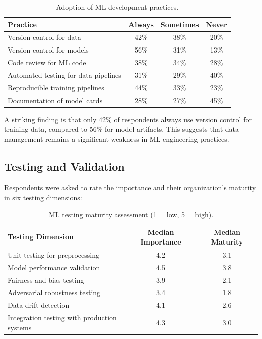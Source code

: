 \documentclass[
    language=english,
    doctype=survey-report,
    institution=none,
]{../../omnilatex}
\begin{document}
\begin{table}[htbp]
    \centering
    \caption{Adoption of ML development practices.}
    \label{tab:dev-practices}
    \begin{tabular}{@{}lccc@{}}
        \toprule
        Practice & Always & Sometimes & Never \\
        \midrule
        Version control for data & 42\% & 38\% & 20\% \\
        Version control for models & 56\% & 31\% & 13\% \\
        Code review for ML code & 38\% & 34\% & 28\% \\
        Automated testing for data pipelines & 31\% & 29\% & 40\% \\
        Reproducible training pipelines & 44\% & 33\% & 23\% \\
        Documentation of model cards & 28\% & 27\% & 45\% \\
        \bottomrule
    \end{tabular}
\end{table}

A striking finding is that only 42\% of respondents always use version
control for training data, compared to 56\% for model artifacts. This
suggests that data management remains a significant weakness in ML
engineering practices.

\subsection{Testing and Validation}

Respondents were asked to rate the importance and their organization's
maturity in six testing dimensions:

\begin{table}[htbp]
    \centering
    \caption{ML testing maturity assessment (1 = low, 5 = high).}
    \label{tab:testing}
    \begin{tabular}{@{}lcc@{}}
        \toprule
        Testing Dimension & Median Importance & Median Maturity \\
        \midrule
        Unit testing for preprocessing & 4.2 & 3.1 \\
        Model performance validation & 4.5 & 3.8 \\
        Fairness and bias testing & 3.9 & 2.1 \\
        Adversarial robustness testing & 3.4 & 1.8 \\
        Data drift detection & 4.1 & 2.6 \\
        Integration testing with production systems & 4.3 & 3.0 \\
        \bottomrule
    \end{tabular}
\end{table}
\end{document}
